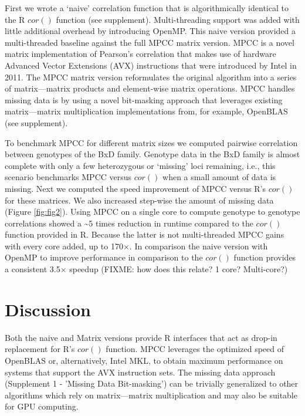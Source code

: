 \documentclass{bioinfo}
\begin{document}
First we wrote a `naive' correlation function that is algorithmically
identical to the R $cor()$ function (see supplement). Multi-threading
support was added with little additional overhead by introducing
OpenMP. This naive version provided a multi-threaded baseline against
the full MPCC matrix version.  MPCC is a novel matrix implementation
of Pearson's correlation that makes use of hardware Advanced Vector
Extensions (AVX) instructions that were introduced by Intel in 2011.
The MPCC matrix version reformulates the original algorithm into a
series of matrix---matrix products and element-wise matrix
operations. MPCC handles missing data is by using a novel bit-masking
approach that leverages existing matrix---matrix multiplication
implementations from, for example, OpenBLAS (see supplement).

To benchmark MPCC for different matrix sizes we computed pairwise
correlation between genotypes of the BxD family.  Genotype data in the
BxD family is almost complete with only a few heterozygous or
`missing' loci remaining, i.e., this scenario benchmarks MPCC versus
$cor()$ when a small amount of data is missing.  Next we computed the
speed improvement of MPCC versus R's $cor()$ for these matrices. We
also increased step-wise the amount of missing data
(Figure \ref{fig:fig2}). Using MPCC on a single core to compute
genotype to genotype correlations showed a \textasciitilde{}5 times
reduction in runtime compared to the $cor()$ function provided in R.
Because the latter is not multi-threaded MPCC gains with every core
added, up to 170$\times$.  In comparison the naive version with OpenMP
to improve performance in comparison to the $cor()$ function provides
a consistent 3.5$\times$ speedup (FIXME: how does this relate? 1 core? Multi-core?)

\section{Discussion}

Both the naive and Matrix versions provide R interfaces that act as
drop-in replacement for R's $cor()$ function.  MPCC leverages the
optimized speed of OpenBLAS or, alternatively, Intel\textregistered{}
MKL, to obtain maximum performance on systems that support the
AVX instruction sets.  The missing data
approach (Supplement 1 - 'Missing Data Bit-masking') can be trivially
generalized to other algorithms which rely on matrix---matrix
multiplication and may also be suitable for GPU computing.
\end{document}
